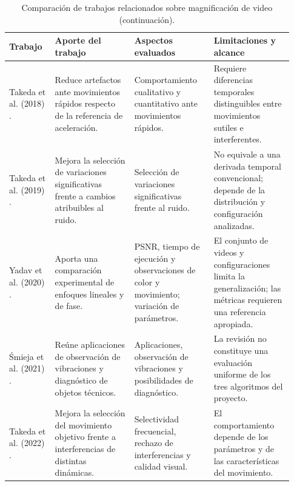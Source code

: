 \begin{table}[p]
\centering
\small
{}
\setlength{\tabcolsep}{4pt}
\renewcommand{\arraystretch}{1.15}
\ContinuedFloat
\caption[]{Comparación de trabajos relacionados sobre magnificación de video (continuación).}
\begin{tabular}{@{}>{\raggedright\arraybackslash}p{0.15\linewidth}>{\raggedright\arraybackslash}p{0.26\linewidth}>{\raggedright\arraybackslash}p{0.26\linewidth}>{\raggedright\arraybackslash}p{0.26\linewidth}@{}}
\toprule
Trabajo & Aporte del trabajo & Aspectos evaluados & Limitaciones y alcance \\
\midrule
Takeda et al. (2018) \cite{takeda2018jerk}. & Reduce artefactos ante movimientos rápidos respecto de la referencia de aceleración. & Comportamiento cualitativo y cuantitativo ante movimientos rápidos. & Requiere diferencias temporales distinguibles entre movimientos sutiles e interferentes. \\
Takeda et al. (2019) \cite{takeda2019wild}. & Mejora la selección de variaciones significativas frente a cambios atribuibles al ruido. & Selección de variaciones significativas frente al ruido. & No equivale a una derivada temporal convencional; depende de la distribución y configuración analizadas. \\
Yadav et al. (2020) \cite{yadav2020performance}. & Aporta una comparación experimental de enfoques lineales y de fase. & PSNR, tiempo de ejecución y observaciones de color y movimiento; variación de parámetros. & El conjunto de videos y configuraciones limita la generalización; las métricas requieren una referencia apropiada. \\
Śmieja et al. (2021) \cite{smieja2021motion}. & Reúne aplicaciones de observación de vibraciones y diagnóstico de objetos técnicos. & Aplicaciones, observación de vibraciones y posibilidades de diagnóstico. & La revisión no constituye una evaluación uniforme de los tres algoritmos del proyecto. \\
Takeda et al. (2022) \cite{takeda2022bilateral}. & Mejora la selección del movimiento objetivo frente a interferencias de distintas dinámicas. & Selectividad frecuencial, rechazo de interferencias y calidad visual. & El comportamiento depende de los parámetros y de las características del movimiento. \\
\bottomrule
\end{tabular}
\end{table}
\clearpage

